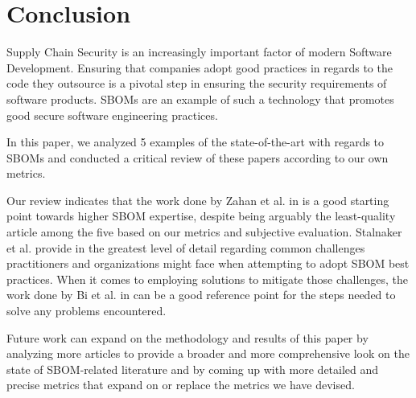 \section{Conclusion}

Supply Chain Security is an increasingly important factor of modern Software Development. Ensuring that companies adopt good practices in regards to the code they outsource is a pivotal step in ensuring the security requirements of software products. SBOMs \cite{article:concept:sbom-2} are an example of such a technology that promotes good secure software engineering practices.

In this paper, we analyzed 5 examples of the state-of-the-art with regards to SBOMs and conducted a critical review of these papers according to our own metrics.

Our review indicates that the work done by Zahan et al. in \cite{article:sbom-required} is a good starting point towards higher SBOM expertise, despite being arguably the least-quality article among the five based on our metrics and subjective evaluation. Stalnaker et al. provide in \cite{article:software-bom} the greatest level of detail regarding common challenges practitioners and organizations might face when attempting to adopt SBOM best practices. When it comes to employing solutions to mitigate those challenges, the work done by Bi et al. in \cite{article:sboms-issues-solutions} can be a good reference point for the steps needed to solve any problems encountered.

Future work can expand on the methodology and results of this paper by analyzing more articles to provide a broader and more comprehensive look on the state of SBOM-related literature and by coming up with more detailed and precise metrics that expand on or replace the metrics we have devised.
